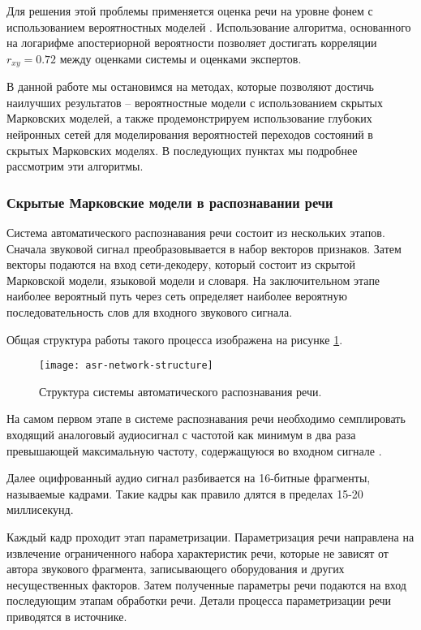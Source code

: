 Для решения этой проблемы применяется оценка речи на уровне фонем с использованием вероятностных моделей \cite{kim1997automatic}. Использование алгоритма, основанного на логарифме апостериорной вероятности позволяет достигать корреляции $r_{xy}=0.72$ между оценками системы и оценками экспертов.

В данной работе мы остановимся на методах, которые позволяют достичь наилучших результатов -- вероятностные модели с использованием скрытых Марковских моделей, а также продемонстрируем использование глубоких нейронных сетей для моделирования вероятностей переходов состояний в скрытых Марковских моделях. В последующих пунктах мы подробнее рассмотрим эти алгоритмы.

\subsubsection{Скрытые Марковские модели в распознавании речи}
Система автоматического распознавания речи состоит из нескольких этапов. Сначала звуковой сигнал преобразовывается в набор векторов признаков. Затем векторы подаются на вход сети-декодеру, который состоит из скрытой Марковской модели, языковой модели и словаря. На заключительном этапе наиболее вероятный путь через сеть определяет наиболее вероятную последовательность слов для входного звукового сигнала.

Общая структура работы такого процесса изображена на рисунке \ref{fig:asr-architecture}.
\begin{figure}[h]
	\centering
	\texttt{[image: asr-network-structure]}
	\caption{Структура системы автоматического распознавания речи.}
	\label{fig:asr-architecture}
\end{figure}

На самом первом этапе в системе распознавания речи необходимо семплировать входящий аналоговый аудиосигнал с частотой как минимум в два раза превышающей максимальную частоту, содержащуюся во входном сигнале \cite{wiki:Nyquist-Shannon_sampling_theorem, web:music_and_computers_sampling}.

Далее оцифрованный аудио сигнал разбивается на 16-битные фрагменты, называемые кадрами. Такие кадры как правило длятся в пределах 15-20 миллисекунд.

Каждый кадр проходит этап параметризации. Параметризация речи направлена на извлечение ограниченного набора характеристик речи, которые не зависят от автора звукового фрагмента, записывающего оборудования и других несущественных факторов. Затем полученные параметры речи подаются на вход последующим этапам обработки речи. Детали процесса параметризации речи приводятся в источнике\cite{ganchev2011contemporary}.

